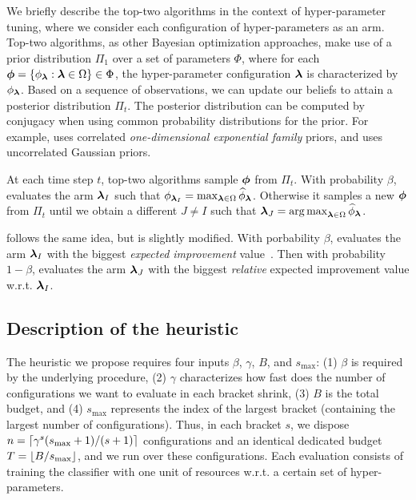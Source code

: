 \documentclass[twoside,11pt]{article}
\begin{document}
We briefly describe the top-two algorithms in the context of hyper-parameter tuning, where we consider each configuration of hyper-parameters as an arm. Top-two algorithms, as other Bayesian optimization approaches, make use of a prior distribution $\Pi_1$ over a set of parameters $\Phi$, where for each ${\boldsymbol \phi}=\{\phi_{{\boldsymbol \lambda}}:{\boldsymbol \lambda}\in\Omega\}\in\Phi$, the hyper-parameter configuration ${\boldsymbol \lambda}$ is characterized by $\phi_{{\boldsymbol \lambda}}$. Based on a sequence of observations, we can update our beliefs to attain a posterior distribution $\Pi_t$. The posterior distribution can be computed by conjugacy when using common probability distributions for the prior. For example, \TTTS uses correlated \emph{one-dimensional exponential family} priors, and \TTEI uses uncorrelated Gaussian priors. 

At each time step $t$, top-two algorithms sample ${\boldsymbol \phi}$ from $\Pi_t$. With probability $\beta$, \TTTS evaluates the arm ${\boldsymbol \lambda}_I$ such that $\phi_{{\boldsymbol \lambda}_I} = \max_{{\boldsymbol \lambda}\in\Omega}\widehat{\phi}_{{\boldsymbol \lambda}}$. Otherwise it samples a new ${\boldsymbol \phi}$ from $\Pi_t$ until we obtain a different $J\neq I$ such that ${\boldsymbol \lambda}_J = \operatorname*{arg\,max}_{{\boldsymbol \lambda}\in\Omega}\widehat{\phi}_{{\boldsymbol \lambda}}$.

\TTEI follows the same idea, but is slightly modified. With porbability $\beta$, \TTEI evaluates the arm ${\boldsymbol \lambda}_I$ with the biggest \emph{expected improvement} value~\citep{mockus1978}. Then with probability $1-\beta$, \TTEI evaluates the arm ${\boldsymbol \lambda}_J$ with the biggest \emph{relative} expected improvement value w.r.t. ${\boldsymbol \lambda}_I$.


\subsection{Description of the heuristic}

The heuristic we propose requires four inputs $\beta$, $\gamma$, $B$, and $s_{\operatorname{max}}$: (1) $\beta$ is required by the underlying \TTTS procedure, (2) $\gamma$ characterizes how fast does the number of configurations we want to evaluate in each bracket shrink, (3) $B$ is the total budget, and (4) $s_{\operatorname{max}}$ represents the index of the largest bracket (containing the largest number of configurations). Thus, in each bracket $s$, we dispose $n = \left\lceil\gamma^s(s_{\operatorname{max}}+1)/(s+1)\right\rceil$ configurations and an identical dedicated budget $T=\left\lfloor B/s_{\operatorname{max}}\right\rfloor$, and we run \TTTS over these configurations. Each evaluation consists of training the classifier with one unit of resources w.r.t. a certain set of hyper-parameters.
\end{document}
